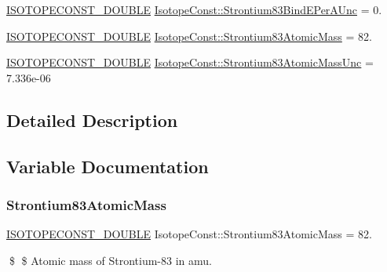 \begin{DoxyCompactItemize}
\mbox{\hyperlink{group___isotope_const-_macros_ga8f45a7272ce02c0b4c65c44636ed719a}{I\+S\+O\+T\+O\+P\+E\+C\+O\+N\+S\+T\+\_\+\+D\+O\+U\+B\+LE}} \mbox{\hyperlink{group___isotope_const-_strontium-_sr83_ga473e3acaae2b2b2e2fbfcae54e8dff29}{Isotope\+Const\+::\+Strontium83\+Bind\+E\+Per\+A\+Unc}} = 0.
\item 
\mbox{\hyperlink{group___isotope_const-_macros_ga8f45a7272ce02c0b4c65c44636ed719a}{I\+S\+O\+T\+O\+P\+E\+C\+O\+N\+S\+T\+\_\+\+D\+O\+U\+B\+LE}} \mbox{\hyperlink{group___isotope_const-_strontium-_sr83_ga4a156fe73f13ed398b94df13461d7357}{Isotope\+Const\+::\+Strontium83\+Atomic\+Mass}} = 82.
\item 
\mbox{\hyperlink{group___isotope_const-_macros_ga8f45a7272ce02c0b4c65c44636ed719a}{I\+S\+O\+T\+O\+P\+E\+C\+O\+N\+S\+T\+\_\+\+D\+O\+U\+B\+LE}} \mbox{\hyperlink{group___isotope_const-_strontium-_sr83_gae70ca2fedaf1fe4e3d17137f767b50b7}{Isotope\+Const\+::\+Strontium83\+Atomic\+Mass\+Unc}} = 7.\+336e-\/06
\end{DoxyCompactItemize}


\subsection{Detailed Description}


\subsection{Variable Documentation}
\mbox{\label{group___isotope_const-_strontium-_sr83_ga4a156fe73f13ed398b94df13461d7357}} 
\subsubsection{\texorpdfstring{Strontium83\+Atomic\+Mass}{Strontium83AtomicMass}}
{\footnotesize\ttfamily \mbox{\hyperlink{group___isotope_const-_macros_ga8f45a7272ce02c0b4c65c44636ed719a}{I\+S\+O\+T\+O\+P\+E\+C\+O\+N\+S\+T\+\_\+\+D\+O\+U\+B\+LE}} Isotope\+Const\+::\+Strontium83\+Atomic\+Mass = 82.}

\$ \$ Atomic mass of Strontium-\/83 in amu. \mbox{\label{group___isotope_const-_strontium-_sr83_gae70ca2fedaf1fe4e3d17137f767b50b7}} 
